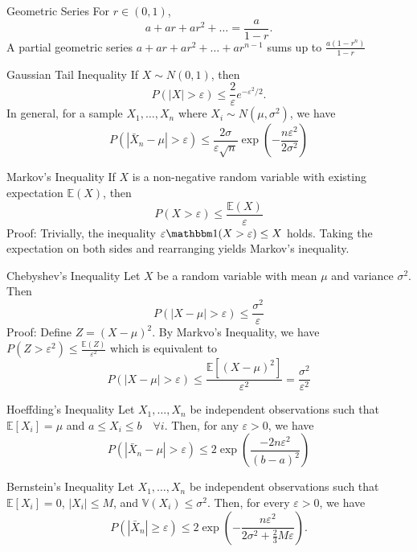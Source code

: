 \documentclass[avery5371,grid]{flashcards}
\begin{document}
\begin{flashcard}[Theorem]{Geometric Series}
For $r \in (0,1)$, 
\[a + ar + ar^2 + \ldots = \frac{a}{1-r}.\] A partial geometric series $a + ar + ar^2 + \ldots + ar^{n-1}$ sums up to $\frac{a(1-r^n)}{1-r}$
\end{flashcard}


\begin{flashcard}[Theorem]{Gaussian Tail Inequality}
If $X \sim N(0,1)$, then 
\[
P(|X|>\varepsilon) \le \frac{2}{\varepsilon}e^{-\varepsilon^2/2}.
\]
In general, for a sample $X_1, \ldots, X_n$ where $X_i \sim N\left(\mu,\sigma^2\right)$, we have
\[
P\left(\left|\bar X_n - \mu \right| > \varepsilon \right) \le \frac{2\sigma}{\varepsilon \sqrt{n}} \exp \left( - \frac{n\varepsilon^2}{2\sigma^2} \right)
\]
\end{flashcard}

\begin{flashcard}[Theorem]{Markov's Inequality}
If $X$ is a non-negative random variable with existing expectation $\mathbb{E}(X)$, then
\[
P\left(X > \varepsilon \right) \le \frac{\mathbb E (X)}{\varepsilon}
\]
Proof:
Trivially, the inequality $\varepsilon \mathbbm 1 (X > \varepsilon) \le X$ holds. Taking the expectation on both sides and rearranging yields Markov's inequality.
\end{flashcard}

\begin{flashcard}[Theorem]{Chebyshev's Inequality}
Let $X$ be a random variable with mean $\mu$ and variance $\sigma^2$. Then
\[
P\left(\left|X-\mu\right| > \varepsilon\right) \le \frac{\sigma^2}{\varepsilon}
\]
Proof:
Define $ Z = (X - \mu)^2$. By Markvo's Inequality, we have $P ( Z > \varepsilon^2) \le \frac{\mathbb{E}(Z)}{\varepsilon^2}$
which is equivalent to 
\[
P\left(\left| X - \mu \right| > \varepsilon\right) \le \frac{\mathbb{E}\left[\left(X-\mu\right)^2\right]}{\varepsilon^2} = \frac{\sigma^2}{\varepsilon^2}
\]
\end{flashcard}

\begin{flashcard}[Theorem]{Hoeffding's Inequality}
Let $X_1, \ldots,X_n$ be independent observations such that $\mathbb{E}[X_i] = \mu$ and $a \le X_i \le b \quad \forall i$. Then, for any $\varepsilon > 0$, we have
\[
P\left(\left|\bar X_n - \mu \right| > \varepsilon\right) \le 2\exp\left( \frac{-2n\varepsilon^2}{(b-a)^2}  \right)
\]
\end{flashcard}

\begin{flashcard}[Theorem]{Bernstein's Inequality}
Let $X_1, \ldots, X_n$ be independent observations such that $\mathbb{E}[X_i] = 0$, $|X_i| \le M$, and $\mathbb{V}(X_i) \le \sigma^2$. Then, for every $\varepsilon > 0$, we have
\[
P\left(\left|\bar X_n \right| \ge \varepsilon\right) \le 2 \exp\left(-\frac{n\varepsilon^2}{2\sigma^2+\frac{2}{3}M\varepsilon}\right).
\]
\end{flashcard}
\end{document}
